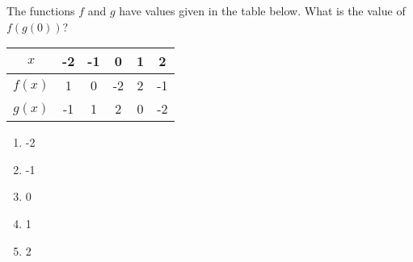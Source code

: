 \bigskip

\item The functions $f$ and $g$ have values given in the table below.  What is the value of $f(g(0))$?

\begin{tabular}{|c|c|c|c|c|c|}
\hline
$x$ & -2 & -1 & 0 & 1 & 2 \\
\hline
$f(x)$ & 1 & 0 & -2 & 2 & -1 \\
\hline
$g(x)$ & -1 & 1 & 2 & 0 & -2 \\
\hline
\end{tabular}

\begin{enumerate}
\item -2 
\item -1 
\item 0 
\item 1 
\item 2 
\end{enumerate}

